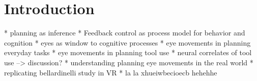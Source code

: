 \section{Introduction}

* planning as inference
* Feedback control as process model for behavior and cognition
* eyes as window to cognitive processes
* eye movements in planning everyday tasks
* eye movements in planning tool use
* neural correlates of tool use --> discussion?
* understanding planning eye movements in the real world
* replicating bellardinelli study in VR
* la la xhueiwbecioecb hehehhe
